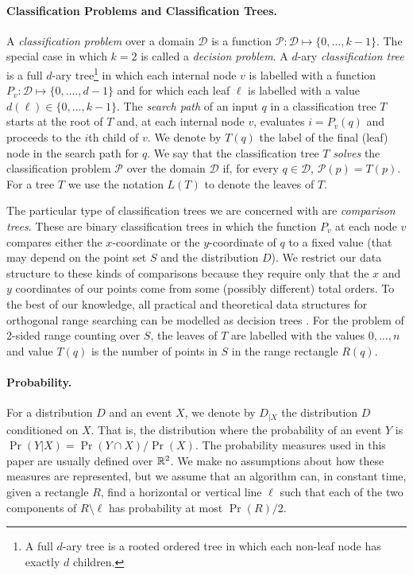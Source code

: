 \documentclass[lotsofwhite,charterfonts]{patmorin}
\newcommand{\leaves}{L}
\begin{document}
\paragraph{Classification Problems and Classification Trees.}

A \emph{classification problem} over a domain $\mathcal{D}$ is a
function $\mathcal{P}:\mathcal{D}\mapsto \{0,\ldots,k-1\}$.  The
special case in which $k=2$ is called a \emph{decision problem}.  A
$d$-ary \emph{classification tree} is a full $d$-ary tree\footnote{A
full $d$-ary tree is a rooted ordered tree in which each non-leaf node
has exactly $d$ children.} in which each internal node $v$ is labelled
with a function $P_v:\mathcal{D}\mapsto\{0,.\ldots,d-1\}$ and for
which each leaf $\ell$ is labelled with a value
$d(\ell)\in\{0,\ldots,k-1\}$. The \emph{search path} of an input $q$
in a classification tree $T$ starts at the root of $T$ and, at each
internal node $v$, evaluates $i=P_v(q)$ and proceeds to the $i$th
child of $v$.  We denote by $T(q)$ the label of the final (leaf) node
in the search path for $q$.  We say that the classification tree $T$
\emph{solves} the classification problem $\mathcal{P}$ over the domain
$\mathcal{D}$ if, for every $q\in \mathcal{D}$, $\mathcal{P}(p)=T(p)$.
For a tree $T$ we use the notation $\leaves(T)$ to denote the leaves
of $T$.

The particular type of classification trees we are concerned with are
\emph{comparison trees}.  These are binary classification trees in
which the function $P_v$ at each node $v$ compares either the
$x$-coordinate or the $y$-coordinate of $q$ to a fixed value (that may
depend on the point set $S$ and the distribution $D$).  We restrict
our data structure to these kinds of comparisons because they require
only that the $x$ and $y$ coordinates of our points come from some
(possibly different) total orders.  To the best of our knowledge, all
practical and theoretical data structures for orthogonal range
searching can be modelled as decision trees \cite{some-survey}.
For the problem of 2-sided range counting over $S$, the leaves of $T$
are labelled with the values $0,\ldots,n$ and value $T(q)$ is the
number of points in $S$ in the range rectangle $R(q)$.


\paragraph{Probability.}

For a distribution $D$ and an event $X$, we denote by $D_{|X}$ the
distribution $D$ conditioned on $X$.  That is, the distribution where
the probability of an event $Y$ is $\Pr(Y|X)=\Pr(Y\cap X)/\Pr(X)$.
The probability measures used in this paper are usually defined over
$\mathbb{R}^2$.  We make no assumptions about how these measures are
represented, but we assume that an algorithm can, in constant time,
given a rectangle $R$, find a horizontal or vertical line $\ell$ such
that each of the two components of $R\setminus \ell$ has probability
at most $\Pr(R)/2$.
\end{document}
